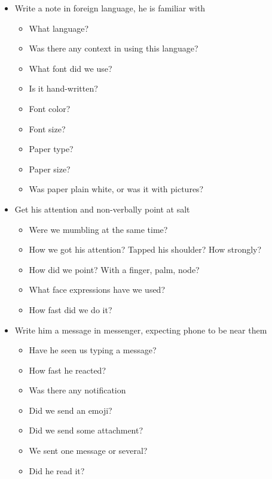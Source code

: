 \documentclass{article}
\begin{document}
\begin{itemize}
                \item Write a note in foreign language, he is familiar with
                \begin{itemize}
                    \item What language?
                    \item Was there any context in using this language?
                    \item What font did we use?
                    \item Is it hand-written?
                    \item Font color?
                    \item Font size?
                    \item Paper type?
                    \item Paper size?
                    \item Was paper plain white, or was it with pictures?
                \end{itemize}

                \item Get his attention and non-verbally point at salt
                \begin{itemize}
                    \item Were we mumbling at the same time?
                    \item How we got his attention? Tapped his shoulder? How strongly?
                    \item How did we point? With a finger, palm, node?
                    \item What face expressions have we used?
                    \item How fast did we do it? 
                \end{itemize}

                \item Write him a message in messenger, expecting phone to be near them
                \begin{itemize}
                    \item Have he seen us typing a message?
                    \item How fast he reacted?
                    \item Was there any notification
                    \item Did we send an emoji?
                    \item Did we send some attachment?
                    \item We sent one message or several?
                    \item Did he read it?
                \end{itemize}


\end{itemize}
\end{document}
